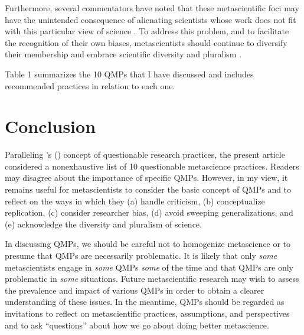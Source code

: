 \documentclass[authordate, meta, issue]{jote-new-article}
\begin{document}
Furthermore, several commentators have noted that these metascientific foci may have the unintended consequence of alienating scientists whose work does not fit with this particular view of science \parencites{Bennett2021}{Kessler2021}{Levin2017}{Malich2022}[p. 58]{McDermott2022}{Penders2022}[p. 530]{Pownall2021}{Prosser2022}[p. 170]{Wentzel2021}. To address this problem, and to facilitate the recognition of their own biases, metascientists should continue to diversify their membership and embrace scientific diversity and pluralism \parencites{Andreoletti2020}{Flis2022}{Gervais2021}{Grossmann2021}{Leonelli2022}{Pownall2022}.



Table 1 summarizes the 10 QMPs that I have discussed and includes recommended practices in relation to each one.




\section{Conclusion}



Paralleling \citeauthor{John2012}'s \mbox{(\hspace*{-.21em}\citeyear{John2012})} concept of questionable research practices, the present article considered a nonexhaustive list of 10 questionable metascience practices\emph{.} Readers may disagree about the importance of specific QMPs. However, in my view, it remains useful for metascientists to consider the basic concept of QMPs and to reflect on the ways in which they (a) handle criticism, (b) conceptualize replication, (c) consider researcher bias, (d) avoid sweeping generalizations, and (e) acknowledge the diversity and pluralism of science.



In discussing QMPs, we should be careful not to homogenize metascience \parencites{Field2022} or to presume that QMPs are necessarily problematic. It is likely that only \emph{some} metascientists engage in \emph{some} QMPs \emph{some} of the time and that QMPs are only problematic in \emph{some} situations. Future metascientific research may wish to assess the prevalence and impact of various QMPs in order to obtain a clearer understanding of these issues. In the meantime, QMPs should be regarded as invitations to reflect on metascientific practices, assumptions, and perspectives and to ask “questions” about how we go about doing better metascience.



\nocite{*}

\printbibliography
\end{document}
